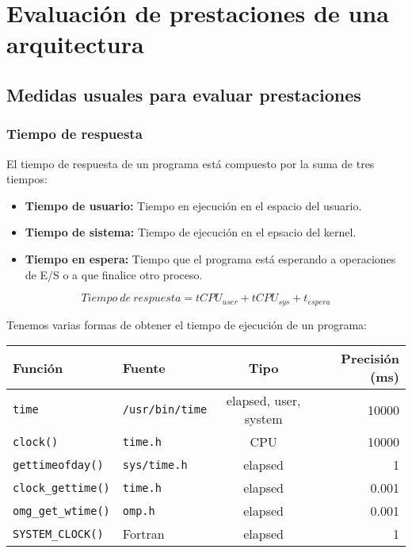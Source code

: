 \section{Evaluación de prestaciones de una arquitectura}\label{evaluacion-prestaciones-arq}

\subsection{Medidas usuales para evaluar prestaciones}\label{medidas-usuales-evaluar-prestaciones}

\subsubsection{Tiempo de respuesta}

El tiempo de respuesta de un programa está compuesto por la suma de tres tiempos:

\begin{itemize}
	\item\textbf{Tiempo de usuario:} Tiempo en ejecución en el espacio del usuario.
	\item\textbf{Tiempo de sistema:} Tiempo de ejecución en el epsacio del kernel.
	\item\textbf{Tiempo en espera:} Tiempo que el programa está esperando a operaciones de E/S o a que finalice otro proceso.
\end{itemize}

\[Tiempo\ de\ respuesta=tCPU_{user}+tCPU_{sys}+t_{espera}\]

Tenemos varias formas de obtener el tiempo de ejecución de un programa:

\begin{center}
\begin{tabular}{l l c r}
	\textbf{Función}           & \textbf{Fuente}        & \textbf{Tipo}         & \textbf{Precisión (ms)} \\
	\toprule
	\texttt{time}              & \texttt{/usr/bin/time} & elapsed, user, system & 10000                   \\
	\texttt{clock()}           & \texttt{time.h}        & CPU                   & 10000                   \\
	\texttt{gettimeofday()}    & \texttt{sys/time.h}    & elapsed               & 1                       \\
	\texttt{clock\_gettime()}  & \texttt{time.h}        & elapsed               & 0.001                   \\
	\texttt{omg\_get\_wtime()} & \texttt{omp.h}         & elapsed               & 0.001                   \\
	\texttt{SYSTEM\_CLOCK()}   & Fortran                & elapsed               & 1                       \\
\end{tabular}
\end{center}

